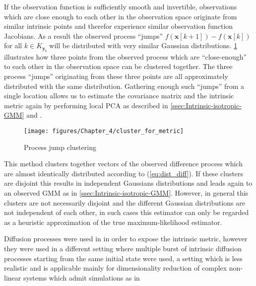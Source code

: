 If the observation function is sufficiently smooth and invertible, observations which are close enough to each other in the observation space originate from similar intrinsic points and therefor experience similar observation function Jacobians. As a result the observed process ``jumps'' $f\left(\mathbf{x}[k+1]\right)-f\left(\mathbf{x}[k]\right)$ for all $k\in K_{\mathbf{y_{i}}}$ will be distributed with very similar Gaussian distributions. \cref{fig:Process-jump-clustering} illustrates how three points from the observed process which are ``close-enough'' to each other in the observation space can be clustered together. The three process ``jumps'' originating from these three points are all approximately distributed with the same distribution. Gathering enough such ``jumps'' from a single location allows us to estimate the covariance matrix and the intrinsic metric again by performing local \ac{PCA} as described in \cref{ssec:Intrinsic-isotropic-GMM} and \cite{tipping1999probabilistic}. 

\begin{figure}[h]
	\centering{}\texttt{[image: figures/Chapter\_4/cluster\_for\_metric]}\caption{Process jump clustering \label{fig:Process-jump-clustering}}
\end{figure}

This method clusters together vectors of the observed difference process which are almost identically distributed according to (\cref{eq:dist_diff}). If these clusters are disjoint this results in independent Gaussians distributions and leads again to an observed \ac{GMM} as in \cref{ssec:Intrinsic-isotropic-GMM}. However, in general this clusters are not necessarily disjoint and the different Gaussian distributions are not independent of each other, in such cases this estimator can only be regarded as a heuristic approximation of the true maximum-likelihood estimator.

Diffusion processes were used in \cite{singer2008non} in order to expose the intrinsic metric, however they were used in a different setting where multiple burst of intrinsic diffusion processes starting from the same initial state were used, a setting which is less realistic and is applicable mainly for dimensionality reduction of complex non-linear systems which admit simulations as in 

